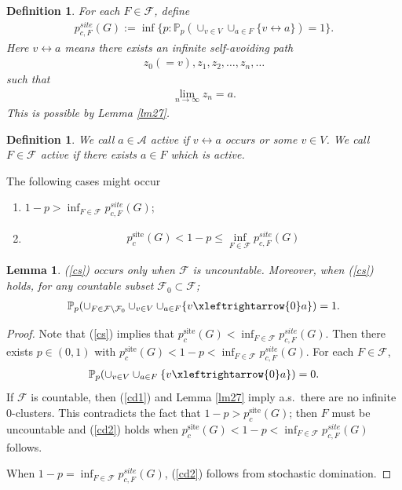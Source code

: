 \documentclass[11pt]{amsart}
\theoremstyle{plain}
\newtheorem{definition}[theorem]{Definition}
\newtheorem{lemma}[theorem]{Lemma}
\numberwithin{equation}{section}
\numberwithin{figure}{section}
\newcommand\PP{{\mathbb P}}
\newcommand\pcs{{p_c^{\mathrm{site}}}}
\begin{document}
\begin{definition}\label{df36}For each $F\in \mathcal{F}$, define
\begin{align*}
p_{c,F}^{site}(G):=\inf\{p:\PP_p(\cup_{v\in V}\cup_{a\in F}\{v\leftrightarrow a\})=1\}.
\end{align*}
Here $v\leftrightarrow a$ means there exists an infinite self-avoiding path
\begin{align*}
z_0(=v),z_1,z_2,\ldots,z_n,\ldots
\end{align*}
such that 
\begin{align*}
\lim_{n\rightarrow\infty}z_n=a.
\end{align*}
This is possible by Lemma \ref{lm27}.
\end{definition}

\begin{definition}We call $a\in \mathcal{A}$ active if $v\leftrightarrow a$ occurs or some $v\in V$. We call $F\in \mathcal{F}$ active if there exists $a\in F$ which is active.
\end{definition}

The following cases might occur
\begin{enumerate}
\item $1-p>\inf_{F\in \mathcal{F}}p_{c,F}^{site}(G)$;
\item 
\begin{align}
\pcs(G)<1-p\leq \inf_{F\in \mathcal{F}}p_{c,F}^{site}(G)\label{cs}
\end{align}
\end{enumerate}

\begin{lemma} (\ref{cs}) occurs only when $\mathcal{F}$ is uncountable. Moreover, when (\ref{cs}) holds, for any countable subset $\mathcal{F}_0\subset \mathcal{F}$;
\begin{align}
\PP_p(\cup_{F\in \mathcal{F}\setminus \mathcal{F}_0}\cup_{v\in V}\cup_{a\in F}\{v\xleftrightarrow{0} a\})=1.\label{cd2}
\end{align}
\end{lemma}

\begin{proof}Note that (\ref{cs}) implies that $\pcs(G)< \inf_{F\in \mathcal{F}}p_{c,F}^{site}(G)$. Then there exists $p\in (0,1)$ with $\pcs(G)<1-p< \inf_{F\in \mathcal{F}}p_{c,F}^{site}(G)$. For each $F\in \mathcal{F}$,
\begin{align}
\PP_p(\cup_{v\in V}\cup_{a\in F}\{v\xleftrightarrow{0} a\})=0.\label{cd1}
\end{align}
If $\mathcal{F}$ is countable, then (\ref{cd1}) and Lemma \ref{lm27} imply a.s.~there are no infinite 0-clusters. This contradicts the fact that $1-p>\pcs(G)$; then $F$ must be uncountable and (\ref{cd2}) holds when $\pcs(G)<1-p< \inf_{F\in \mathcal{F}}p_{c,F}^{site}(G)$ follows.

When $1-p=\inf_{F\in \mathcal{F}}p_{c,F}^{site}(G)$, (\ref{cd2}) follows from stochastic domination.
\end{proof}
\end{document}
